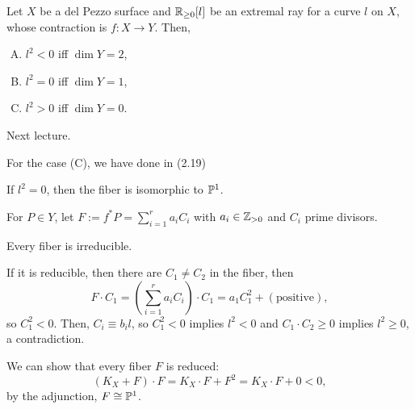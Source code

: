 \documentclass{../../small}
\begin{document}
\begin{lem}
Let $X$ be a del Pezzo surface and $\R_{\ge0}[l]$ be an extremal ray for a curve $l$ on $X$, whose contraction is $f:X\to Y$.
Then,
\begin{enumerate}[(A)]
\item $l^2<0$ iff $\dim Y=2$,
\item $l^2=0$ iff $\dim Y=1$,
\item $l^2>0$ iff $\dim Y=0$.
\end{enumerate}
\end{lem}
\begin{pf}
Next lecture.

For the case (C), we have done in (2.19)
\end{pf}

\begin{prop}[(B)]
If $l^2=0$, then the fiber is isomorphic to $\P^1$.
\end{prop}
\begin{pf}
For $P\in Y$, let $F:=f^*P=\sum_{i=1}^ra_iC_i$ with $a_i\in\Z_{>0}$ and $C_i$ prime divisors.
\begin{clm}
Every fiber is irreducible.
\end{clm}
\begin{pf}
If it is reducible, then there are $C_1\ne C_2$ in the fiber, then
\[F\cdot C_1=(\sum_{i=1}^ra_iC_i)\cdot C_1=a_1C_1^2+(\text{positive}),\]
so $C_1^2<0$.
Then, $C_i\equiv b_il$, so $C_1^2<0$ implies $l^2<0$ and $C_1\cdot C_2\ge0$ implies $l^2\ge0$, a contradiction.
\end{pf}
We can show that every fiber $F$ is reduced:
\[(K_X+F)\cdot F=K_X\cdot F+F^2=K_X\cdot F+0<0,\]
by the adjunction, $F\cong\P^1$.
\end{pf}
\end{document}

